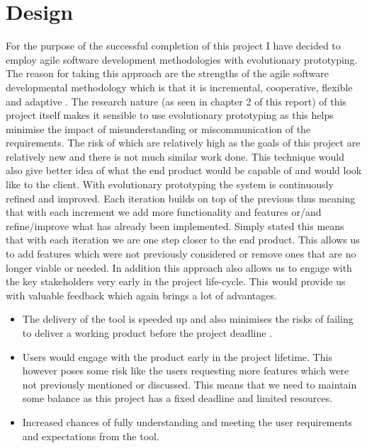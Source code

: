 \chapter{Design}
For the purpose of the successful completion of this project I have decided to employ agile software development methodologies with evolutionary prototyping. The reason for taking this approach are the strengths of the agile software developmental methodology which is that it is incremental, cooperative, flexible and adaptive \cite{4147390}. The research nature (as seen in chapter 2 of this report) of this project itself makes it sensible to use evolutionary prototyping \cite{Connell89} as this helps minimise the impact of misunderstanding or miscommunication of the requirements. The risk of which are relatively high as the goals of this project are relatively new and there is not much similar work done. This technique would also give better idea of what the end product would be capable of and would look like to the client. With evolutionary prototyping the system is continuously refined and improved. Each iteration builds on top of the previous thus meaning that with each increment we add more functionality and features or/and refine/improve what has already been implemented. Simply stated this means that with each iteration we are one step closer to the end product. This allows us to add features which were not previously considered or remove ones that are no longer viable or needed. In addition this approach also allows us to engage with the key stakeholders very early in the project life-cycle. This would provide us with valuable feedback which again brings a lot of advantages.

\begin{itemize}
	\item The delivery of the tool is speeded up and also minimises the risks of failing to deliver a working product before the project deadline \cite{Connell89}.
	\item Users would engage with the product early in the project lifetime. This however poses some risk like the users requesting more features which were not previously mentioned or discussed. This means that we need to maintain some balance as this project has a fixed deadline and limited resources.
	\item Increased chances of fully understanding and meeting the user requirements and expectations from the tool.
\end{itemize}


